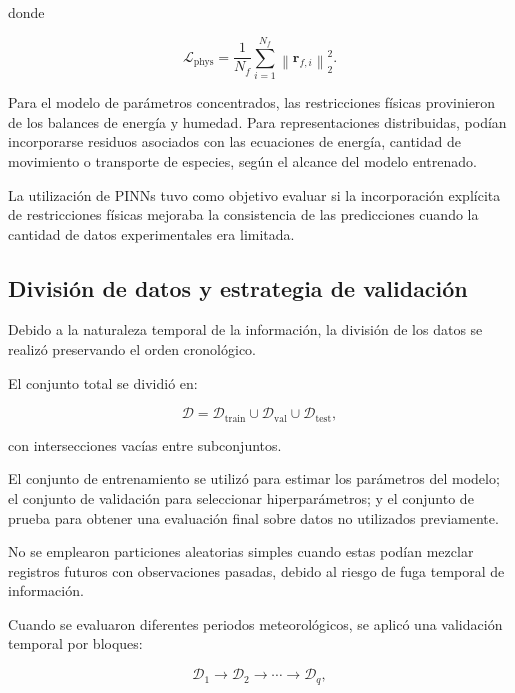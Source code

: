 donde

\begin{equation}
\mathcal{L}_{\mathrm{phys}}
=
\frac{1}{N_f}
\sum_{i=1}^{N_f}
\left\|
\mathbf{r}_{f,i}
\right\|_2^2.
\end{equation}

Para el modelo de parámetros concentrados, las restricciones físicas provinieron de los balances de energía y humedad. Para representaciones distribuidas, podían incorporarse residuos asociados con las ecuaciones de energía, cantidad de movimiento o transporte de especies, según el alcance del modelo entrenado.

La utilización de PINNs tuvo como objetivo evaluar si la incorporación explícita de restricciones físicas mejoraba la consistencia de las predicciones cuando la cantidad de datos experimentales era limitada.

\subsection{División de datos y estrategia de validación}
\label{subsec:division_datos_ml}

Debido a la naturaleza temporal de la información, la división de los datos se realizó preservando el orden cronológico.

El conjunto total se dividió en:

\begin{equation}
\mathcal{D}
=
\mathcal{D}_{\mathrm{train}}
\cup
\mathcal{D}_{\mathrm{val}}
\cup
\mathcal{D}_{\mathrm{test}},
\end{equation}

con intersecciones vacías entre subconjuntos.

El conjunto de entrenamiento se utilizó para estimar los parámetros del modelo; el conjunto de validación para seleccionar hiperparámetros; y el conjunto de prueba para obtener una evaluación final sobre datos no utilizados previamente.

No se emplearon particiones aleatorias simples cuando estas podían mezclar registros futuros con observaciones pasadas, debido al riesgo de fuga temporal de información.

Cuando se evaluaron diferentes periodos meteorológicos, se aplicó una validación temporal por bloques:

\begin{equation}
\mathcal{D}_1
\rightarrow
\mathcal{D}_2
\rightarrow
\cdots
\rightarrow
\mathcal{D}_q,
\end{equation}

